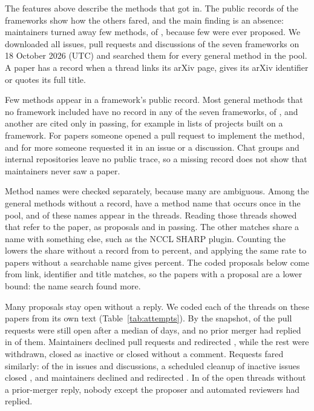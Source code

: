 \documentclass{article}
\begin{document}
The features above describe the methods that got in. The public records of the frameworks show how the others fared, and the main finding is an absence: maintainers turned away few methods, \NRefusedPapers{} of \NNotIncluded{}, because few were ever proposed. We downloaded all \NThreads{} issues, pull requests and discussions of the seven frameworks on 18 October 2026 (UTC) and searched them for every general method in the pool. A paper has a record when a thread links its arXiv page, gives its arXiv identifier or quotes its full title.

Few methods appear in a framework's public record. Most general methods that no framework included have no record in any of the seven frameworks, \NNoRecord{} of \NNotIncluded{}, and another \NCitedOnly{} are cited only in passing, for example in lists of projects built on a framework. For \NImplPapers{} papers someone opened a pull request to implement the method, and for \NRequestPapers{} more someone requested it in an issue or a discussion. Chat groups and internal repositories leave no public trace, so a missing record does not show that maintainers never saw a paper.

Method names were checked separately, because many are ambiguous. Among the \NNoRecord{} general methods without a record, \NNameSearch{} have a method name that occurs once in the pool, and \NNameCand{} of these names appear in the threads. Reading those threads showed that \NNameRefers{} refer to the paper, \NNameProposal{} as proposals and \NNameCited{} in passing. The other matches share a name with something else, such as the NCCL SHARP plugin. Counting the \NNameRefers{} lowers the share without a record from \NNoRecordPct{} to \NNoRecordAfterPct{} percent, and applying the same rate to papers without a searchable name gives \NNoRecordExtrapPct{} percent. The coded proposals below come from link, identifier and title matches, so the \NAttemptPapers{} papers with a proposal are a lower bound: the name search found \NNameProposal{} more.

Many proposals stay open without a reply. We coded each of the \NAttemptThreads{} threads on these \NAttemptPapers{} papers from its own text (Table~\ref{tab:attempts}). By the snapshot, \NPROpen{} of the \NAttemptPRs{} pull requests were still open after a median of \OpenPRMedianAge{} days, and no prior merger had replied in \NPROpenNoReply{} of them. Maintainers declined \NPRDeclined{} pull requests and redirected \NPRRedirected{}, while the rest were withdrawn, closed as inactive or closed without a comment. Requests fared similarly: of the \NAttemptRequests{} in issues and discussions, a scheduled cleanup of inactive issues closed \NReqStale{}, and maintainers declined \NReqDeclined{} and redirected \NReqRedirected{}. In \NNoMergerReplyNone{} of the \NNoMergerReply{} open threads without a prior-merger reply, nobody except the proposer and automated reviewers had replied.
\end{document}
